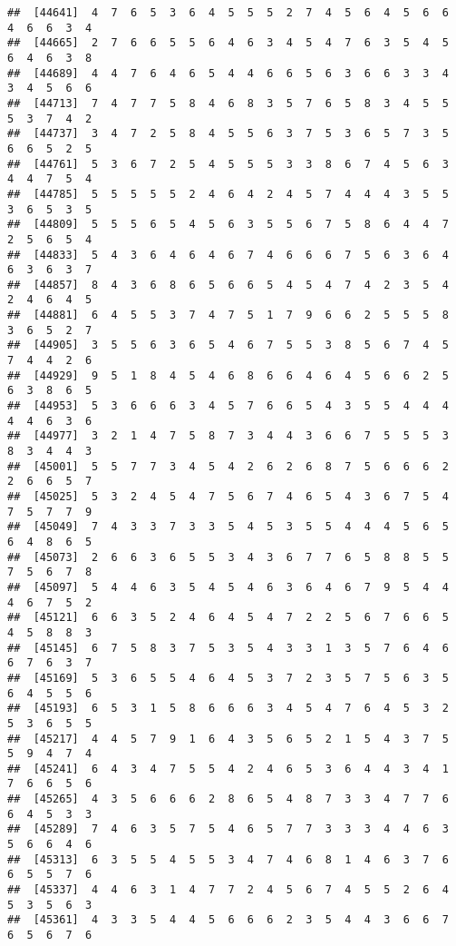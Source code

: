 \documentclass[
]{book}
\begin{document}
\begin{verbatim}
##  [44641]  4  7  6  5  3  6  4  5  5  5  2  7  4  5  6  4  5  6  6  4  6  6  3  4
##  [44665]  2  7  6  6  5  5  6  4  6  3  4  5  4  7  6  3  5  4  5  6  4  6  3  8
##  [44689]  4  4  7  6  4  6  5  4  4  6  6  5  6  3  6  6  3  3  4  3  4  5  6  6
##  [44713]  7  4  7  7  5  8  4  6  8  3  5  7  6  5  8  3  4  5  5  5  3  7  4  2
##  [44737]  3  4  7  2  5  8  4  5  5  6  3  7  5  3  6  5  7  3  5  6  6  5  2  5
##  [44761]  5  3  6  7  2  5  4  5  5  5  3  3  8  6  7  4  5  6  3  4  4  7  5  4
##  [44785]  5  5  5  5  5  2  4  6  4  2  4  5  7  4  4  4  3  5  5  3  6  5  3  5
##  [44809]  5  5  5  6  5  4  5  6  3  5  5  6  7  5  8  6  4  4  7  2  5  6  5  4
##  [44833]  5  4  3  6  4  6  4  6  7  4  6  6  6  7  5  6  3  6  4  6  3  6  3  7
##  [44857]  8  4  3  6  8  6  5  6  6  5  4  5  4  7  4  2  3  5  4  2  4  6  4  5
##  [44881]  6  4  5  5  3  7  4  7  5  1  7  9  6  6  2  5  5  5  8  3  6  5  2  7
##  [44905]  3  5  5  6  3  6  5  4  6  7  5  5  3  8  5  6  7  4  5  7  4  4  2  6
##  [44929]  9  5  1  8  4  5  4  6  8  6  6  4  6  4  5  6  6  2  5  6  3  8  6  5
##  [44953]  5  3  6  6  6  3  4  5  7  6  6  5  4  3  5  5  4  4  4  4  4  6  3  6
##  [44977]  3  2  1  4  7  5  8  7  3  4  4  3  6  6  7  5  5  5  3  8  3  4  4  3
##  [45001]  5  5  7  7  3  4  5  4  2  6  2  6  8  7  5  6  6  6  2  2  6  6  5  7
##  [45025]  5  3  2  4  5  4  7  5  6  7  4  6  5  4  3  6  7  5  4  7  5  7  7  9
##  [45049]  7  4  3  3  7  3  3  5  4  5  3  5  5  4  4  4  5  6  5  6  4  8  6  5
##  [45073]  2  6  6  3  6  5  5  3  4  3  6  7  7  6  5  8  8  5  5  7  5  6  7  8
##  [45097]  5  4  4  6  3  5  4  5  4  6  3  6  4  6  7  9  5  4  4  4  6  7  5  2
##  [45121]  6  6  3  5  2  4  6  4  5  4  7  2  2  5  6  7  6  6  5  4  5  8  8  3
##  [45145]  6  7  5  8  3  7  5  3  5  4  3  3  1  3  5  7  6  4  6  6  7  6  3  7
##  [45169]  5  3  6  5  5  4  6  4  5  3  7  2  3  5  7  5  6  3  5  6  4  5  5  6
##  [45193]  6  5  3  1  5  8  6  6  6  3  4  5  4  7  6  4  5  3  2  5  3  6  5  5
##  [45217]  4  4  5  7  9  1  6  4  3  5  6  5  2  1  5  4  3  7  5  5  9  4  7  4
##  [45241]  6  4  3  4  7  5  5  4  2  4  6  5  3  6  4  4  3  4  1  7  6  6  5  6
##  [45265]  4  3  5  6  6  6  2  8  6  5  4  8  7  3  3  4  7  7  6  6  4  5  3  3
##  [45289]  7  4  6  3  5  7  5  4  6  5  7  7  3  3  3  4  4  6  3  5  6  6  4  6
##  [45313]  6  3  5  5  4  5  5  3  4  7  4  6  8  1  4  6  3  7  6  6  5  5  7  6
##  [45337]  4  4  6  3  1  4  7  7  2  4  5  6  7  4  5  5  2  6  4  5  3  5  6  3
##  [45361]  4  3  3  5  4  4  5  6  6  6  2  3  5  4  4  3  6  6  7  6  5  6  7  6

\end{verbatim}
\end{document}
